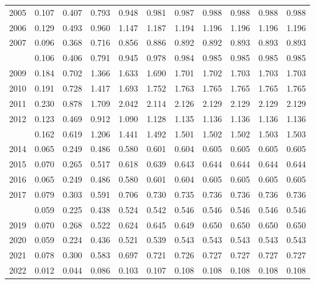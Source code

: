 \documentclass[
]{article}
\begin{document}
\begin{longtable}[t]{lrrrrrrrrrr}
2005 & 0.107 & 0.407 & 0.793 & 0.948 & 0.981 & 0.987 & 0.988 & 0.988 & 0.988 & 0.988\\
2006 & 0.129 & 0.493 & 0.960 & 1.147 & 1.187 & 1.194 & 1.196 & 1.196 & 1.196 & 1.196\\
2007 & 0.096 & 0.368 & 0.716 & 0.856 & 0.886 & 0.892 & 0.892 & 0.893 & 0.893 & 0.893\\
\addlinespace
2008 & 0.106 & 0.406 & 0.791 & 0.945 & 0.978 & 0.984 & 0.985 & 0.985 & 0.985 & 0.985\\
2009 & 0.184 & 0.702 & 1.366 & 1.633 & 1.690 & 1.701 & 1.702 & 1.703 & 1.703 & 1.703\\
2010 & 0.191 & 0.728 & 1.417 & 1.693 & 1.752 & 1.763 & 1.765 & 1.765 & 1.765 & 1.765\\
2011 & 0.230 & 0.878 & 1.709 & 2.042 & 2.114 & 2.126 & 2.129 & 2.129 & 2.129 & 2.129\\
2012 & 0.123 & 0.469 & 0.912 & 1.090 & 1.128 & 1.135 & 1.136 & 1.136 & 1.136 & 1.136\\
\addlinespace
2013 & 0.162 & 0.619 & 1.206 & 1.441 & 1.492 & 1.501 & 1.502 & 1.502 & 1.503 & 1.503\\
2014 & 0.065 & 0.249 & 0.486 & 0.580 & 0.601 & 0.604 & 0.605 & 0.605 & 0.605 & 0.605\\
2015 & 0.070 & 0.265 & 0.517 & 0.618 & 0.639 & 0.643 & 0.644 & 0.644 & 0.644 & 0.644\\
2016 & 0.065 & 0.249 & 0.486 & 0.580 & 0.601 & 0.604 & 0.605 & 0.605 & 0.605 & 0.605\\
2017 & 0.079 & 0.303 & 0.591 & 0.706 & 0.730 & 0.735 & 0.736 & 0.736 & 0.736 & 0.736\\
\addlinespace
2018 & 0.059 & 0.225 & 0.438 & 0.524 & 0.542 & 0.546 & 0.546 & 0.546 & 0.546 & 0.546\\
2019 & 0.070 & 0.268 & 0.522 & 0.624 & 0.645 & 0.649 & 0.650 & 0.650 & 0.650 & 0.650\\
2020 & 0.059 & 0.224 & 0.436 & 0.521 & 0.539 & 0.543 & 0.543 & 0.543 & 0.543 & 0.543\\
2021 & 0.078 & 0.300 & 0.583 & 0.697 & 0.721 & 0.726 & 0.727 & 0.727 & 0.727 & 0.727\\
2022 & 0.012 & 0.044 & 0.086 & 0.103 & 0.107 & 0.108 & 0.108 & 0.108 & 0.108 & 0.108\\*
\end{longtable}
\end{document}
